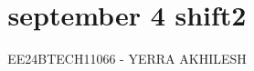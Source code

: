 \documentclass[journal]{IEEEtran}
\begin{document}

\vspace{3cm}

\title{september 4 shift2}
\author{EE24BTECH11066 - YERRA AKHILESH
}
{\let\newpage\relax\maketitle}

\renewcommand{\thefigure}{\theenumi}
\renewcommand{\thetable}{\theenumi}
\setlength{\intextsep}{10pt} %


\renewcommand{\thetable}{\theenumi}
\end{document}
